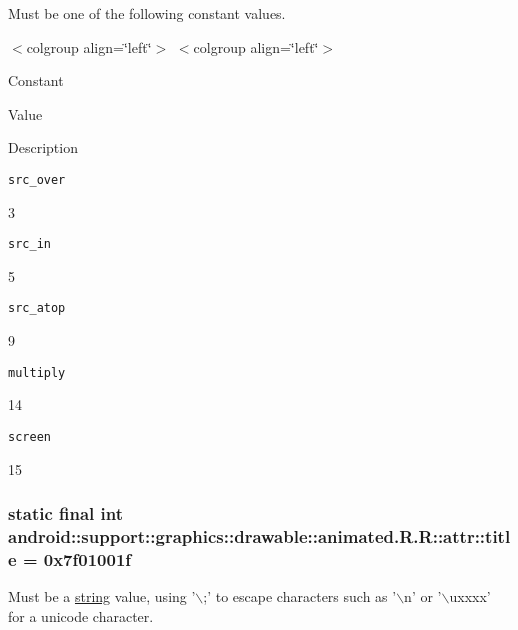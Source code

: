 Must be one of the following constant values. \begin{TabularC}{0}
\hline
\end{TabularC}
$<$colgroup align=\char`\"{}left\char`\"{}$>$ $<$colgroup align=\char`\"{}left\char`\"{}$>$ 

Constant

Value

Description 

{\tt src\_\-over}

3

{\tt src\_\-in}

5

{\tt src\_\-atop}

9

{\tt multiply}

14

{\tt screen}

15\hypertarget{classandroid_1_1support_1_1graphics_1_1drawable_1_1animated_1_1_r_1_1attr_027e065675e38bb9f37e489350a850a3}{
\subsubsection[{title}]{\setlength{\rightskip}{0pt plus 5cm}static final int android::support::graphics::drawable::animated.R.R::attr::title = 0x7f01001f}}
\label{classandroid_1_1support_1_1graphics_1_1drawable_1_1animated_1_1_r_1_1attr_027e065675e38bb9f37e489350a850a3}


Must be a \hyperlink{classandroid_1_1support_1_1graphics_1_1drawable_1_1animated_1_1_r_1_1string}{string} value, using '$\backslash$;' to escape characters such as '$\backslash$n' or '$\backslash$uxxxx' for a unicode character. 

